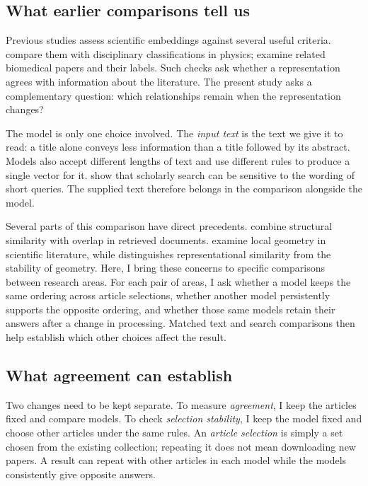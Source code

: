 \documentclass[12pt]{article}
\begin{document}
\subsection{What earlier comparisons tell us}
Previous studies assess scientific embeddings against several useful criteria. \citet{refc0e2cc29e0} compare them with disciplinary classifications in physics; \citet{refbe130e2973} examine related biomedical papers and their labels. Such checks ask whether a representation agrees with information about the literature. The present study asks a complementary question: which relationships remain when the representation changes?

The model is only one choice involved. The \emph{input text} is the text we give it to read: a title alone conveys less information than a title followed by its abstract. Models also accept different lengths of text and use different rules to produce a single vector for it. \citet{singh-singh-2022-inefficiency} show that scholarly search can be sensitive to the wording of short queries. The supplied text therefore belongs in the comparison alongside the model.

Several parts of this comparison have direct precedents. \citet{ref4e1e0d5582} combine structural similarity with overlap in retrieved documents. \citet{ref6da178065c} examine local geometry in scientific literature, while \citet{ref483cb38608} distinguishes representational similarity from the stability of geometry. Here, I bring these concerns to specific comparisons between research areas. For each pair of areas, I ask whether a model keeps the same ordering across article selections, whether another model persistently supports the opposite ordering, and whether those same models retain their answers after a change in processing. Matched text and search comparisons then help establish which other choices affect the result.

\subsection{What agreement can establish}
Two changes need to be kept separate. To measure \emph{agreement}, I keep the articles fixed and compare models. To check \emph{selection stability}, I keep the model fixed and choose other articles under the same rules. An \emph{article selection} is simply a set chosen from the existing collection; repeating it does not mean downloading new papers. A result can repeat with other articles in each model while the models consistently give opposite answers.
\end{document}
